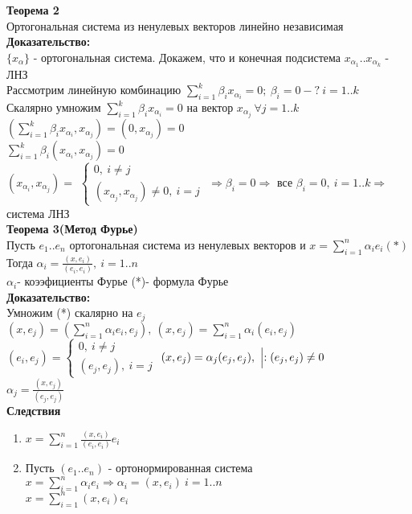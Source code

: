 \textbf{Теорема 2} \\
Ортогональная система из ненулевых векторов линейно независимая \\
\textbf{Доказательство: } \\
$\{ x_{\alpha} \}$ - ортогональная система. Докажем, что и конечная подсистема $x_{\alpha_1}..x_{\alpha_k}$ - ЛНЗ \\
Рассмотрим линейную комбинацию $\sum \limits_{i=1}^k {\beta_i x_{\alpha_i}}=0; \ \beta_i=0-? \ i=1..k$ \\
Скалярно умножим $\sum \limits_{i=1}^k {\beta_i x_{\alpha_i}}=0$ на вектор $x_{\alpha_j} \ \forall j=1..k$ \\
$\left( \sum \limits_{i=1}^k {\beta_i x_{\alpha_i}},x_{\alpha_j} \right)  =(0,x_{\alpha_j}) = 0$ \\
$\sum \limits_{i=1}^k {\beta_i (x_{\alpha_i},x_{\alpha_j})} = 0$ \\ 
$(x_{\alpha_i},x_{\alpha_j}) = $
$\left\{ \begin{matrix}
\mbox{$0, \ i \ne j $} \\
\mbox{$(x_{\alpha_j},x_{\alpha_j})\ne 0, \ i=j$}
\end{matrix}\right.$
$\Rightarrow \beta_i = 0 \Rightarrow$ все $\beta_i=0, \ i=1..k \Rightarrow$ система ЛНЗ \\
\textbf{Теорема 3(Метод Фурье)} \\
Пусть $e_1..e_n$ ортогональная система из ненулевых векторов и $x=\sum \limits_{i=1}^n {\alpha_i e_i} (*) $ \\
Тогда $\alpha_i= \frac{(x,e_i)}{(e_i,e_i)}, \ i=1..n$\\
$\alpha_i$- коээфициенты Фурье (*)- формула Фурье \\
\textbf{Доказательство: } \\
Умножим (*) скалярно на $e_j$ \\
$(x,e_j)=\left( \sum \limits_{i=1}^{n} {\alpha_i e_i},e_j \right), \ (x,e_j) = \sum \limits_{i=1}^n {\alpha_i (e_i,e_j)} $ \\
$(e_i,e_j)=\left\{ \begin{matrix}
\mbox{$0, \ i \ne j $} \\
\mbox{$(e_j,e_j), \ i=j$}
\end{matrix}\right.$
$(x,e_j)=\alpha_j(e_j,e_j), \ \Bigl| :(e_j,e_j) \ne 0 $ \\
$\alpha_j= \frac{(x,e_j)}{(e_j,e_j)}$ \\
\textbf{Следствия} \\
\begin{enumerate}
 \item $x=\sum \limits_{i=1}^n {\frac{(x,e_i)}{(e_i,e_i)} e_i}$
 \item Пусть $(e_1..e_n)$ - ортонормированная система $ x = \sum \limits_{i=1}^n {\alpha_i e_i} \Rightarrow \alpha_i = (x,e_i) \ i=1..n $ \\
       $x=\sum \limits_{i=1}^n {(x,e_i)e_i} $
\end{enumerate}
